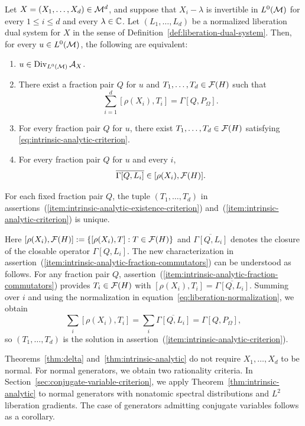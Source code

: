 \begin{theorem}\label{thm:intrinsic-analytic}
Let $X=(X_1,\ldots,X_d)\in\mathcal M^d$, and suppose that $X_i-\lambda$ is invertible in $L^0(\mathcal M)$ for every $1\leq i\leq d$ and every $\lambda\in\mathbb C$.
Let $(L_1,\ldots,L_d)$ be a normalized liberation dual system for $X$ in the sense of Definition~\ref{def:liberation-dual-system}.
Then, for every $u\in L^0(\mathcal M)$, the following are equivalent:
\begin{enumerate}
\item $u\in\operatorname{Div}_{L^0(\mathcal M)}\mathcal A_X$.
\item\label{item:intrinsic-analytic-existence-criterion}  There exist a fraction pair $Q$ for $u$ and $T_1,\ldots,T_d\in\mathcal F(H)$ such that
\begin{equation}
 \sum_{i=1}^d[\rho(X_i),T_i]=\Gamma[Q,P_\Omega].
 \label{eq:intrinsic-analytic-criterion}
\end{equation}
\item\label{item:intrinsic-analytic-criterion} For every fraction pair $Q$ for $u$, there exist $T_1,\ldots,T_d\in\mathcal F(H)$ satisfying \eqref{eq:intrinsic-analytic-criterion}.
\item\label{item:intrinsic-analytic-fraction-commutators} For every fraction pair $Q$ for $u$ and every $i$,
\[
 \overline{\Gamma[Q,L_i]}\in[\rho(X_i),\mathcal F(H)].
\]
\end{enumerate}
For each fixed fraction pair $Q$, the tuple $(T_1,\ldots,T_d)$ in assertions~\textup{(\ref{item:intrinsic-analytic-existence-criterion})} and~\textup{(\ref{item:intrinsic-analytic-criterion})} is unique.
\end{theorem}

Here $[\rho(X_i),\mathcal F(H)]:=\{[\rho(X_i),T]:T\in\mathcal F(H)\}$ and $\overline{\Gamma[Q,L_i]}$ denotes the closure of the closable operator $\Gamma[Q,L_i]$.
The new characterization in assertion~\textup{(\ref{item:intrinsic-analytic-fraction-commutators})} can be understood as follows.
For any fraction pair $Q$, assertion~\textup{(\ref{item:intrinsic-analytic-fraction-commutators})} provides $T_i\in\mathcal F(H)$ with $[\rho(X_i),T_i]=\overline{\Gamma[Q,L_i]}$.
Summing over $i$ and using the normalization in equation~\eqref{eq:liberation-normalization}, we obtain
\[
 \sum_i[\rho(X_i),T_i]
 =\sum_i\overline{\Gamma[Q,L_i]}
 =\Gamma[Q,P_\Omega],
\]
so $(T_1,\ldots,T_d)$ is the solution in assertion~\textup{(\ref{item:intrinsic-analytic-criterion})}.

Theorems~\ref{thm:delta} and~\ref{thm:intrinsic-analytic} do not require $X_1,\ldots,X_d$ to be normal.
For normal generators, we obtain two rationality criteria.
In Section~\ref{sec:conjugate-variable-criterion}, we apply Theorem~\ref{thm:intrinsic-analytic} to normal generators with nonatomic spectral distributions and $L^2$ liberation gradients.
The case of generators admitting conjugate variables follows as a corollary.

